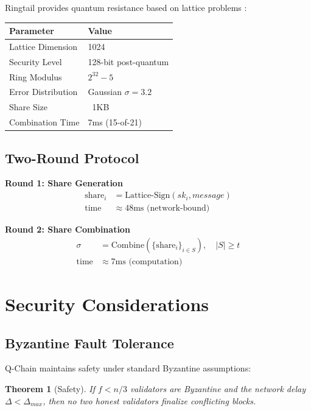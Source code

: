 \documentclass[11pt]{article}
\newtheorem{theorem}{Theorem}
\begin{document}
Ringtail provides quantum resistance based on lattice problems \cite{ntt-ringtail}:

\begin{table}[h]
\centering
\begin{tabular}{@{}ll@{}}
\toprule
\textbf{Parameter} & \textbf{Value} \\
\midrule
Lattice Dimension & 1024 \\
Security Level & 128-bit post-quantum \\
Ring Modulus & $2^{32} - 5$ \\
Error Distribution & Gaussian $\sigma = 3.2$ \\
Share Size & ~1KB \\
Combination Time & 7ms (15-of-21) \\
\bottomrule
\end{tabular}

\label{tab:ringtail-params}
\end{table}

\subsection{Two-Round Protocol}

\textbf{Round 1: Share Generation}
\begin{align}
\text{share}_i &= \text{Lattice-Sign}(sk_i, message) \\
\text{time} &\approx 48\text{ms (network-bound)}
\end{align}

\textbf{Round 2: Share Combination}
\begin{align}
\sigma &= \text{Combine}(\{\text{share}_i\}_{i \in S}), \quad |S| \geq t \\
\text{time} &\approx 7\text{ms (computation)}
\end{align}

\section{Security Considerations}

\subsection{Byzantine Fault Tolerance}

Q-Chain maintains safety under standard Byzantine assumptions:

\begin{theorem}[Safety]
If $f < n/3$ validators are Byzantine and the network delay $\Delta < \Delta_{max}$, then no two honest validators finalize conflicting blocks.
\end{theorem}
\end{document}
